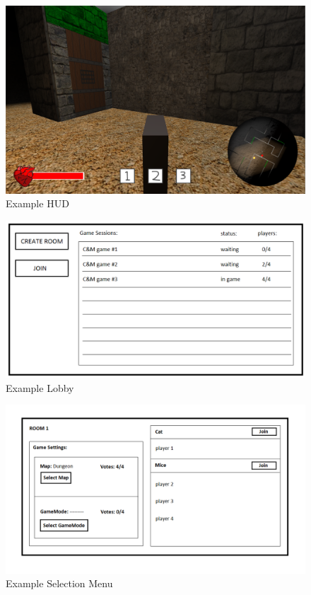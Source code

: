 \documentclass[12pt, titlepage]{article}
\begin{document}
\begin{figure}
    \centering
    \includegraphics[width=1.00\textwidth]{HUD}
    \caption{Example HUD}
    \label{fig:HUD}
\end{figure}
\begin{figure}
    \centering
    \includegraphics[width=1.00\textwidth]{lobby}
    \caption{Example Lobby}
    \label{fig:lobby}
\end{figure}
\begin{figure}
    \centering
    \includegraphics[width=1.00\textwidth]{select}
    \caption{Example Selection Menu}
    \label{fig:select}
\end{figure}
\end{document}

